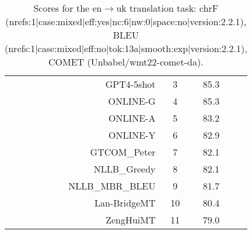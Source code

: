 \documentclass[11pt]{article}
\begin{document}
\begin{table}
\begin{subtable}[t]{0.33\textwidth}
\begin{tabular}{rccc}
GPT4-5shot & 3 & 85.3 \\ 
ONLINE-G & 4 & 85.3 \\ 
ONLINE-A & 5 & 83.2 \\ 
ONLINE-Y & 6 & 82.9 \\ 
GTCOM\_Peter & 7 & 82.1 \\ 
NLLB\_Greedy & 8 & 82.1 \\ 
NLLB\_MBR\_BLEU & 9 & 81.7 \\ 
Lan-BridgeMT & 10 & 80.4 \\ 
ZengHuiMT & 11 & 79.0 \\ 
\bottomrule 
\end{tabular} 
\end{subtable} 
\caption{Scores for the en$\rightarrow$uk translation task: chrF (nrefs:1|case:mixed|eff:yes|nc:6|nw:0|space:no|version:2.2.1), BLEU (nrefs:1|case:mixed|eff:no|tok:13a|smooth:exp|version:2.2.1), COMET (Unbabel/wmt22-comet-da).} 
\end{table} 
\end{document}
